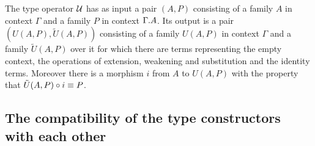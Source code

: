 The type operator $\mathcal{U}$ has as input a pair $(A,P)$ consisting of a family
$A$ in context $\Gamma$ and a family $P$ in context $\ctxext{\Gamma}{A}$. Its
output is a pair $(U(A,P),\tilde{U}(A,P))$ consisting of a family
$U(A,P)$ in context $\Gamma$ and a family $\tilde{U}(A,P)$ over it for which
there are terms representing the empty context, the operations of extension,
weakening and substitution and the identity terms. Moreover there is a morphism
$i$ from $A$ to $U(A,P)$ with the property that 
$\jcomp{}{i}{\tilde{U}(A,P)}\jdeq P$.

\subsection{The compatibility of the type constructors with each other}
\label{compatibility-of-type-constructors}
